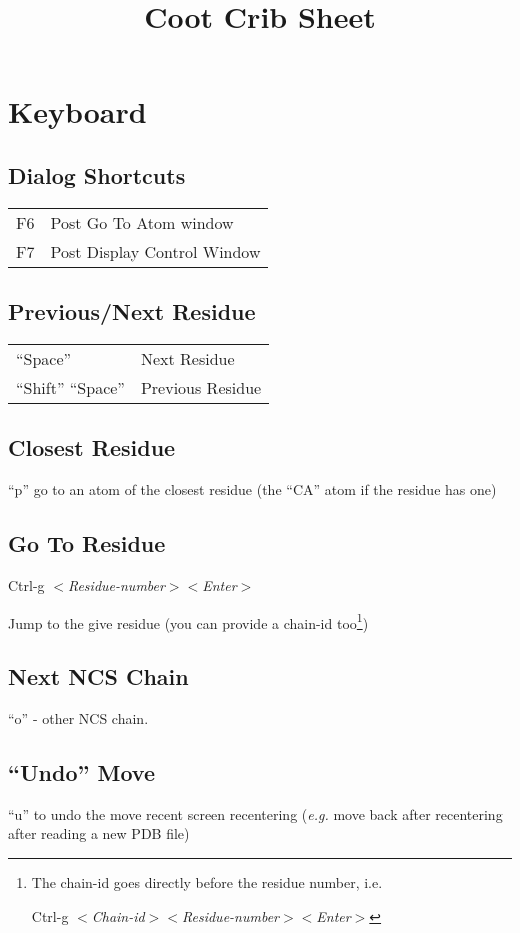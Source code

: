 \documentclass[twocolumn]{article}
\title{Coot Crib Sheet}
\begin{document}
\maketitle

\section{Keyboard}

\subsection{Dialog Shortcuts}
\begin{tabular}{ll}
  F6  & Post Go To Atom window \\
  F7  & Post Display Control Window\\
\end{tabular}

\subsection{Previous/Next Residue}

\begin{tabular}{ll}
  ``Space'' & Next Residue \\
  ``Shift'' ``Space'' & Previous Residue
\end{tabular}

\subsection{Closest Residue}
``p'' go to an atom of the closest residue (the ``CA'' atom if the
residue has one)

\subsection{Go To Residue}
Ctrl-g $<$\emph{Residue-number}$>$$<$\emph{Enter}$>$

Jump to the give residue (you can provide a chain-id too\footnote
{The chain-id goes directly before the residue number, i.e.
 
Ctrl-g $<$\emph{Chain-id}$>$$<$\emph{Residue-number}$>$$<$\emph{Enter}$>$})

\subsection{Next NCS Chain}
``o'' - other NCS chain.

\subsection{``Undo'' Move}
``u'' to undo the move recent screen recentering (\emph{e.g.} move
back after recentering after reading a new PDB file)
\end{document}
